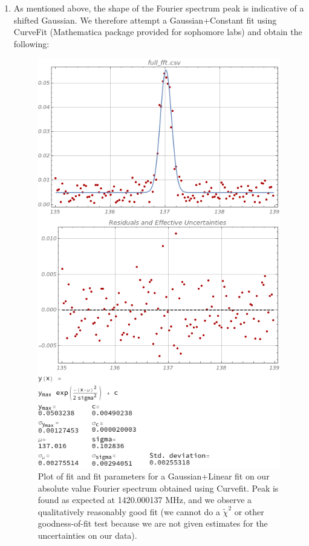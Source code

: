 \documentclass[11pt]{article}
\begin{document}
\begin{enumerate}
	\item As mentioned above, the shape of the Fourier spectrum peak is indicative of a shifted Gaussian. We therefore attempt a Gaussian+Constant fit using CurveFit (Mathematica package provided for sophomore labs) and obtain the following:
	\begin{figure}[htp]
	\centering
	\includegraphics[scale=0.58]{curvefit_arecibo_fft_1.png}
	\caption{Plot of fit and fit parameters for a Gaussian+Linear fit on our absolute value Fourier spectrum obtained using Curvefit. Peak is found as expected at 1420.000137 MHz, and we observe a qualitatively reasonably good fit (we cannot do a $\tilde \chi^2$ or other goodness-of-fit test because we are not given estimates for the uncertainties on our data).}
	\label{curvefit_fft_1}
	\end{figure}
	

\end{enumerate}
\end{document}
